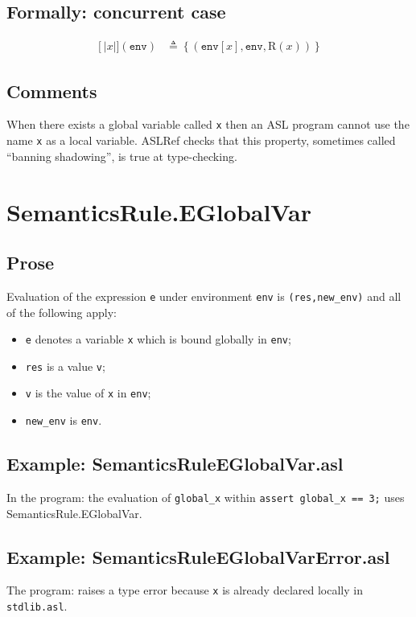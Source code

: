 \documentclass{book}
\newcommand\llbracket{[|}
\newcommand\rrbracket{|]}
\newcommand\interp[1]{\left\llbracket #1 \right\rrbracket}
\begin{document}
  \subsection{Formally: concurrent case}
  \begin{align}
  \interp{x}(\texttt{env}) & \triangleq \left\{ (\texttt{env}[x], \texttt{env}, \text{R} (x)) \right\}
  \label{eq:sem-conc-var}
  \end{align} 
 
  \subsection{Comments}
  When there exists a global variable called \texttt{x} then an ASL program
  cannot use the name \texttt{x} as a local variable. ASLRef checks that this
  property, sometimes called ``banning shadowing'', is true at type-checking.

\section{SemanticsRule.EGlobalVar \label{sec:SemanticsRule.EGlobalVar}}

  \subsection{Prose}

  Evaluation of the expression \texttt{e} under environment \texttt{env} is
  \texttt{(res,new\_env)} and all of the following apply:
  \begin{itemize}
  \item \texttt{e} denotes a variable \texttt{x} which is bound globally in \texttt{env};
  \item \texttt{res} is a value \texttt{v};
  \item \texttt{v} is the value of \texttt{x} in \texttt{env};
  \item \texttt{new\_env} is \texttt{env}.
  \end{itemize}

  \subsection{Example: SemanticsRuleEGlobalVar.asl}
    In the program:
    the evaluation of \texttt{global\_x} within \texttt{assert global\_x == 3;}
    uses SemanticsRule.EGlobalVar.

  \subsection{Example: SemanticsRuleEGlobalVarError.asl}
    The program:
    raises a type error because \texttt{x} is already declared locally in
    \texttt{stdlib.asl}.
\end{document}
